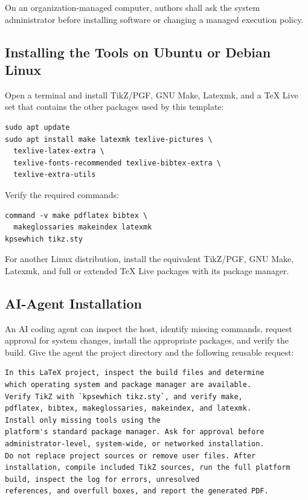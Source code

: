 On an organization-managed computer, authors shall ask the system administrator
before installing software or changing a managed execution policy.

\subsection{Installing the Tools on Ubuntu or Debian Linux}

Open a terminal and install TikZ/PGF, GNU Make, Latexmk, and a TeX
Live set that contains the other packages used by this template:

\begin{verbatim}
sudo apt update
sudo apt install make latexmk texlive-pictures \
  texlive-latex-extra \
  texlive-fonts-recommended texlive-bibtex-extra \
  texlive-extra-utils
\end{verbatim}

Verify the required commands:

\begin{verbatim}
command -v make pdflatex bibtex \
  makeglossaries makeindex latexmk
kpsewhich tikz.sty
\end{verbatim}

For another Linux distribution, install the equivalent TikZ/PGF, GNU
Make, Latexmk, and full or extended TeX Live packages with its package manager.

\subsection{AI-Agent Installation}
\label{Section:AIAgentInstallation}

An AI coding agent can inspect the host, identify missing commands, request
approval for system changes, install the appropriate packages, and verify the
build. Give the agent the project directory and the following reusable request:

\begin{verbatim}
In this LaTeX project, inspect the build files and determine
which operating system and package manager are available.
Verify TikZ with `kpsewhich tikz.sty`, and verify make,
pdflatex, bibtex, makeglossaries, makeindex, and latexmk.
Install only missing tools using the
platform's standard package manager. Ask for approval before
administrator-level, system-wide, or networked installation.
Do not replace project sources or remove user files. After
installation, compile included TikZ sources, run the full platform
build, inspect the log for errors, unresolved
references, and overfull boxes, and report the generated PDF.
\end{verbatim}

